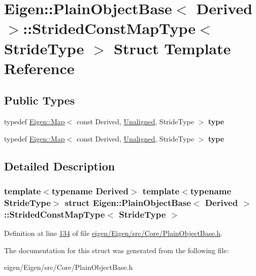 \hypertarget{struct_eigen_1_1_plain_object_base_1_1_strided_const_map_type}{}\section{Eigen\+:\+:Plain\+Object\+Base$<$ Derived $>$\+:\+:Strided\+Const\+Map\+Type$<$ Stride\+Type $>$ Struct Template Reference}
\label{struct_eigen_1_1_plain_object_base_1_1_strided_const_map_type}
\subsection*{Public Types}
\begin{DoxyCompactItemize}
\item 
\mbox{\label{struct_eigen_1_1_plain_object_base_1_1_strided_const_map_type_a0219be33d5d936ea7f75c64a53720f43}} 
typedef \hyperlink{group___core___module_class_eigen_1_1_map}{Eigen\+::\+Map}$<$ const Derived, \hyperlink{group__enums_gga45fe06e29902b7a2773de05ba27b47a1ac935220b4c844108e183ebe30a4d5204}{Unaligned}, Stride\+Type $>$ {\bfseries type}
\item 
\mbox{\label{struct_eigen_1_1_plain_object_base_1_1_strided_const_map_type_a0219be33d5d936ea7f75c64a53720f43}} 
typedef \hyperlink{group___core___module_class_eigen_1_1_map}{Eigen\+::\+Map}$<$ const Derived, \hyperlink{group__enums_gga45fe06e29902b7a2773de05ba27b47a1ac935220b4c844108e183ebe30a4d5204}{Unaligned}, Stride\+Type $>$ {\bfseries type}
\end{DoxyCompactItemize}


\subsection{Detailed Description}
\subsubsection*{template$<$typename Derived$>$\newline
template$<$typename Stride\+Type$>$\newline
struct Eigen\+::\+Plain\+Object\+Base$<$ Derived $>$\+::\+Strided\+Const\+Map\+Type$<$ Stride\+Type $>$}



Definition at line \hyperlink{eigen_2_eigen_2src_2_core_2_plain_object_base_8h_source_l00134}{134} of file \hyperlink{eigen_2_eigen_2src_2_core_2_plain_object_base_8h_source}{eigen/\+Eigen/src/\+Core/\+Plain\+Object\+Base.\+h}.



The documentation for this struct was generated from the following file\+:\begin{DoxyCompactItemize}
\item 
eigen/\+Eigen/src/\+Core/\+Plain\+Object\+Base.\+h\end{DoxyCompactItemize}
